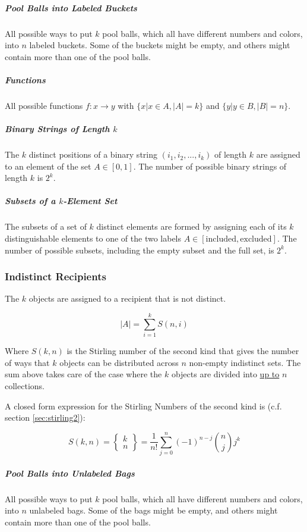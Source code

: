 \subparagraph{Pool Balls into Labeled Buckets} All possible ways to put $k$ pool balls, which all have different numbers and colors, into $n$ labeled buckets. Some of the buckets might be empty, and others might contain more than one of the pool balls.

\subparagraph{Functions} All possible functions $f:x \rightarrow y$ with $\{x | x\in A, |A| = k \}$ and $\{y | y\in B, |B| = n\}$.

\subparagraph{Binary Strings of Length $k$} The $k$ distinct positions of a binary string $(i_1,i_2,...,i_k)$ of length $k$ are assigned to an element of the set $A\in[0,1]$. The number of possible binary strings of length $k$ is $2^k$.

\subparagraph{Subsets of a $k$-Element Set} The subsets of a set of $k$ distinct elements are formed by assigning each of its $k$ distinguishable elements to one of the two labels $A\in [\mathrm{included},\mathrm{excluded}]$. The number of possible subsets, including the empty subset and the full set, is $2^k$.

\subsubsection{Indistinct Recipients}
The $k$ objects are assigned to a recipient that is not distinct. 

\begin{equation}
|A| = \sum_{i=1}^k S(n,i)
\end{equation}

Where $S(k,n)$ is the Stirling number of the second kind that gives the number of ways that $k$ objects can be distributed across $n$ non-empty indistinct sets. The sum above takes care of the case where the $k$ objects are divided into \underline{up to} $n$ collections.  

A closed form expression for the Stirling Numbers of the second kind is (c.f. section \ref{sec:stirling2}): 

\begin{equation}
S(k,n) = \left\{ \begin{array}{c} k \\n \end{array} \right\} = \frac{1}{n!}\sum_{j=0}^n (-1)^{n-j} {n \choose j }j^k
\label{eq:stirling2}
\end{equation}


\subparagraph{Pool Balls into Unlabeled Bags} All possible ways to put $k$ pool balls, which all have different numbers and colors, into $n$ unlabeled bags. Some of the bags might be empty, and others might contain more than one of the pool balls.


